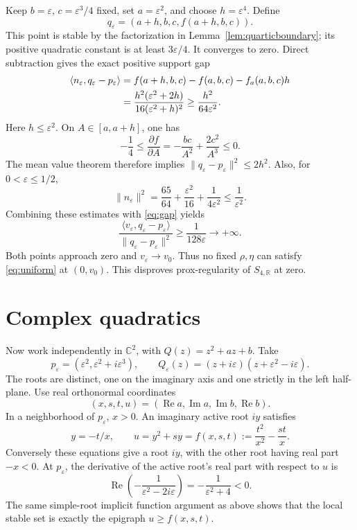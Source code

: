 \documentclass[11pt]{article}
\newcommand{\R}{\mathbb R}
\newcommand{\C}{\mathbb C}
\newcommand{\ip}[2]{\langle #1,#2\rangle}
\newcommand{\norm}[1]{\lVert #1\rVert}
\begin{document}
Keep \(b=\varepsilon\), \(c=\varepsilon^3/4\) fixed, set \(a=\varepsilon^2\), and choose \(h=\varepsilon^4\). Define
\[
 q_\varepsilon=(a+h,b,c,f(a+h,b,c)).
\]
This point is stable by the factorization in Lemma~\ref{lem:quarticboundary}; its positive quadratic constant is at least \(3\varepsilon/4\). It converges to zero. Direct subtraction gives the exact positive support gap
\begin{align}
 \ip{n_\varepsilon}{q_\varepsilon-p_\varepsilon}
 &=f(a+h,b,c)-f(a,b,c)-f_a(a,b,c)h \notag\\
 &=\frac{h^2(\varepsilon^2+2h)}
          {16(\varepsilon^2+h)^2}
 \geq\frac{h^2}{64\varepsilon^2}.             \label{eq:gap}
\end{align}
Here \(h\leq\varepsilon^2\). On \(A\in[a,a+h]\), one has
\[
 -\frac14\leq
 \frac{\partial f}{\partial A}
 =-\frac{bc}{A^2}+\frac{2c^2}{A^3}\leq0.
\]
The mean value theorem therefore implies
\(\norm{q_\varepsilon-p_\varepsilon}^2\leq2h^2\).
Also, for \(0<\varepsilon\leq1/2\),
\[
 \norm{n_\varepsilon}^2
 =\frac{65}{64}+\frac{\varepsilon^2}{16}
                    +\frac{1}{4\varepsilon^2}
 \leq\frac{1}{\varepsilon^2}.
\]
Combining these estimates with \eqref{eq:gap} yields
\begin{equation}\label{eq:divergence}
 \frac{\ip{v_\varepsilon}{q_\varepsilon-p_\varepsilon}}
      {\norm{q_\varepsilon-p_\varepsilon}^2}
 \geq\frac{1}{128\varepsilon}\longrightarrow+\infty.
\end{equation}
Both points approach zero and \(v_\varepsilon\to v_0\). Thus no fixed \(\rho,\eta\) can satisfy \eqref{eq:uniform} at \((0,v_0)\). This disproves prox-regularity of \(S_{4,\R}\) at zero.

\section{Complex quadratics}

Now work independently in \(\C^2\), with
\(Q(z)=z^2+az+b\). Take
\[
 p_\varepsilon=(\varepsilon^2,\varepsilon^2+i\varepsilon^3),
 \qquad
 Q_\varepsilon(z)=(z+i\varepsilon)(z+\varepsilon^2-i\varepsilon).
\]
The roots are distinct, one on the imaginary axis and one strictly in the left half-plane. Use real orthonormal coordinates
\[
 (x,s,t,u)=(\operatorname{Re}a,\operatorname{Im}a,
            \operatorname{Im}b,\operatorname{Re}b).
\]
In a neighborhood of \(p_\varepsilon\), \(x>0\). An imaginary active root \(iy\) satisfies
\[
 y=-t/x,\qquad u=y^2+sy
       =f(x,s,t):=\frac{t^2}{x^2}-\frac{st}{x}.
\]
Conversely these equations give a root \(iy\), with the other root having real part \(-x<0\).
At \(p_\varepsilon\), the derivative of the active root's real part with respect to \(u\) is
\[
 \operatorname{Re}\left(-\frac{1}{\varepsilon^2-2i\varepsilon}\right)
 =-\frac{1}{\varepsilon^2+4}<0.
\]
The same simple-root implicit function argument as above shows that the local stable set is exactly the epigraph \(u\geq f(x,s,t)\).
\end{document}
